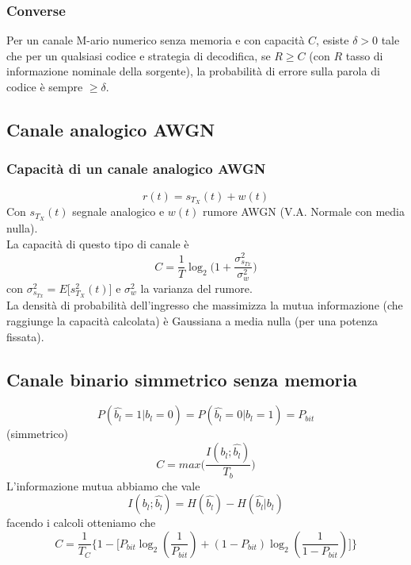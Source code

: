 \documentclass{article}
\begin{document}
\subsubsection{Converse}
Per un canale M-ario numerico senza memoria e con capacità $C$, esiste $\delta>0$ tale che per un qualsiasi codice e strategia di decodifica, se $R\geq C$ (con $R$ tasso di informazione nominale della sorgente), la probabilità di errore sulla parola di codice è sempre $\geq\delta$.\\

\subsection{Canale analogico AWGN}

\subsubsection{Capacità di un canale analogico AWGN}
$$r(t)=s_{T_X}(t)+w(t)$$
Con $s_{T_X}(t)$ segnale analogico e $w(t)$ rumore AWGN (V.A. Normale con media nulla).\\
La capacità di questo tipo di canale è $$C=\frac{1}{T}\log_2\big(1+\frac{\sigma_{s_{Tx}}^2}{\sigma_w^2}\big)$$
con $\sigma_{s_{Tx}}^2=E\big[s_{T_X}^2(t)\big]$ e $\sigma_w^2$ la varianza del rumore.\\
La densità di probabilità dell'ingresso che massimizza la mutua informazione (che raggiunge la capacità calcolata) è Gaussiana a media nulla (per una potenza fissata).\\

\subsection{Canale binario simmetrico senza memoria}
$$P(\hat{b_l}=1|b_l=0)=P(\hat{b_l}=0|b_l=1)=P_{bit}$$ (simmetrico)\\
$$C=max\big(\frac{I(b_l;\hat{b_l})}{T_b}\big)$$
L'informazione mutua abbiamo che vale $$I(b_l;\hat{b_l}) = H(\hat{b_l})-H(\hat{b_l}|b_l)$$
facendo i calcoli otteniamo che $$C=\frac{1}{T_C}\big\{1-\big[P_{bit}\log_2(\frac{1}{P_{bit}})+(1-P_{bit})\log_2(\frac{1}{1-P_{bit}})\big]\}$$
\end{document}
